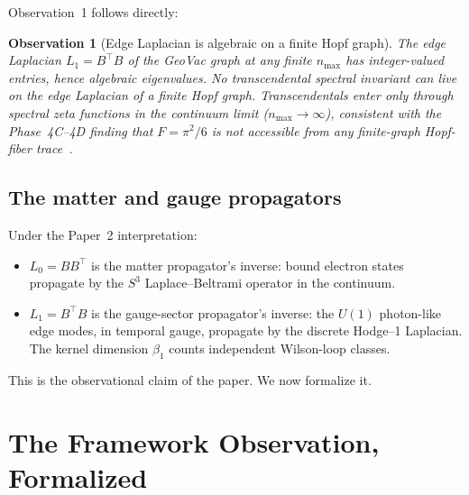 \documentclass[aps,pra,twocolumn,superscriptaddress,longbibliography]{revtex4-2}
\newtheorem{observation}{Observation}
\begin{document}
Observation~1 follows directly:

\begin{observation}[Edge Laplacian is algebraic on a finite
    Hopf graph]
\label{obs:edge_algebraic}
The edge Laplacian $L_1 = B^{\top} B$ of the GeoVac graph at any
finite $n_{\max}$ has integer-valued entries, hence algebraic
eigenvalues.  No transcendental spectral invariant can live on the
edge Laplacian of a finite Hopf graph.  Transcendentals enter only
through spectral zeta functions in the continuum limit
($n_{\max} \to \infty$), consistent with the Phase~4C--4D finding
that $F = \pi^2/6$ is not accessible from any finite-graph
Hopf-fiber trace~\cite{Paper2}.
\end{observation}

\subsection{The matter and gauge propagators}

Under the Paper~2 interpretation:
\begin{itemize}
\item $L_0 = B B^{\top}$ is the matter propagator's inverse: bound
  electron states propagate by the $S^3$ Laplace--Beltrami operator
  in the continuum.
\item $L_1 = B^{\top} B$ is the gauge-sector propagator's inverse:
  the $U(1)$ photon-like edge modes, in temporal gauge, propagate by
  the discrete Hodge--1 Laplacian.  The kernel dimension
  $\beta_1$ counts independent Wilson-loop classes.
\end{itemize}
This is the observational claim of the paper.  We now formalize it.


\section{The Framework Observation, Formalized}
\label{sec:framework}
\end{document}
